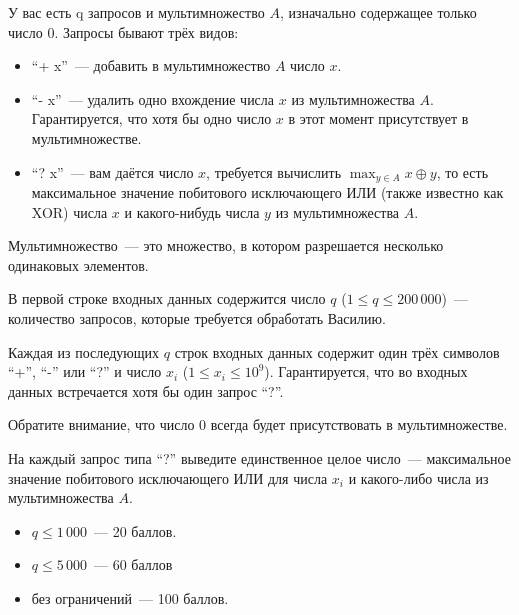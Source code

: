 
\Legend
У вас есть q запросов и мультимножество $A$, изначально содержащее только число $0$. Запросы бывают трёх видов:
\begin{itemize}
	\item ``+ x''~--- добавить в мультимножество $A$ число $x$.
	\item ``- x''~--- удалить одно вхождение числа $x$ из мультимножества $A$. Гарантируется, что хотя бы одно число $x$ в этот момент присутствует в мультимножестве.
	\item ``? x''~--- вам даётся число $x$, требуется вычислить $\max_{y \in A}{x \oplus y}$, то есть максимальное значение побитового исключающего ИЛИ (также известно как XOR) числа $x$ и какого-нибудь числа $y$ из мультимножества $A$.
\end{itemize}

Мультимножество~--- это множество, в котором разрешается несколько одинаковых элементов.

\Input
В первой строке входных данных содержится число $q$ ($1 \le q \le 200\,000$)~--- количество запросов, которые требуется обработать Василию.

Каждая из последующих $q$ строк входных данных содержит один трёх символов ``+'', ``-'' или ``?'' и число $x_i$ ($1 \le x_i \le 10^9$).
Гарантируется, что во входных данных встречается хотя бы один запрос ``?''.

Обратите внимание, что число $0$ всегда будет присутствовать в мультимножестве.

\Output
На каждый запрос типа ``?'' выведите единственное целое число~--- максимальное значение побитового исключающего ИЛИ для числа $x_i$ и какого-либо числа из мультимножества $A$.

\Samples
\BeginTests
{}
\EndTests

\Scoring
\begin{itemize}
	\item $q \le 1\,000$~--- 20 баллов.
	\item $q \le 5\,000$~--- 60 баллов
	\item без ограничений~--- 100 баллов.
\end{itemize}

\EndProblem
